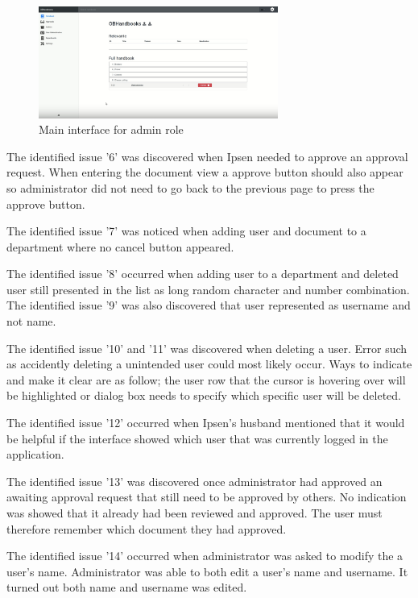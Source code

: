 \begin{figure}[H]
	\centering
		\includegraphics[width=0.7\textwidth]{billeder/MainInterfaceAdmin.png}
	\caption{Main interface for admin role}\label{fig:MainInterfaceAdmin}
\end{figure}

The identified issue '6' was discovered when Ipsen needed to approve an approval request.
When entering the document view a approve button should also appear so administrator did not need to go back to the previous page to press the approve button.

The identified issue '7' was noticed when adding user and document to a department where no cancel button appeared.

The identified issue '8' occurred when adding user to a department and deleted user still presented in the list as long random character and number combination. The identified issue '9' was also discovered that user represented as username and not name.

The identified issue '10'  and '11' was discovered when deleting a user.
Error such as accidently deleting a unintended user could most likely occur.
Ways to indicate and make it clear are as follow; the user row that the cursor is hovering over will be highlighted or dialog box needs to specify which specific user will be deleted.

The identified issue '12' occurred when Ipsen's husband mentioned that it would be helpful if the interface showed which user that was currently logged in the application.

The identified issue '13' was discovered once administrator had approved an awaiting approval request that still need to be approved by others.
No indication was showed that it already had been reviewed and approved.
The user must therefore remember which document they had approved.

The identified issue '14' occurred when administrator was asked to modify the a user's name.
Administrator was able to both edit a user's name and username.
It turned out both name and username was edited.

